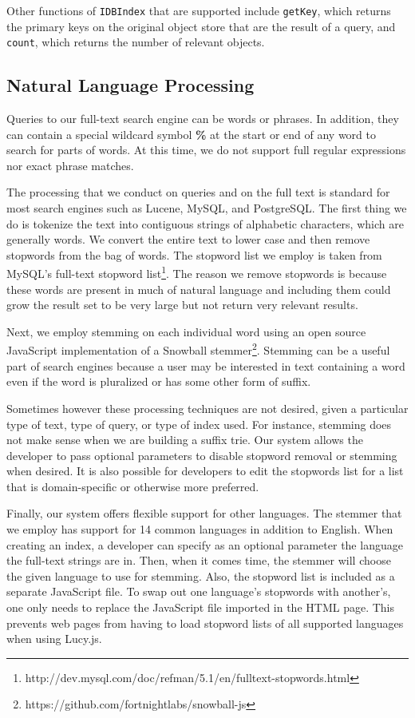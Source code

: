 \documentclass{vldb}
\begin{document}
Other functions of \texttt{IDBIndex} that are supported include \texttt{getKey}, which returns the primary keys on the original object store that are the result of a query, and \texttt{count}, which returns the number of relevant objects.


\subsection{Natural Language Processing}

Queries to our full-text search engine can be words or phrases. In addition, they can contain a special wildcard symbol \textbf{\%} at the start or end of any word to search for parts of words. At this time, we do not support full regular expressions nor exact phrase matches.

The processing that we conduct on queries and on the full text is standard for most search engines such as Lucene, MySQL, and PostgreSQL. The first thing we do is tokenize the text into contiguous strings of alphabetic characters, which are generally words. We convert the entire text to lower case and then remove stopwords from the bag of words. The stopword list we employ is taken from MySQL's full-text stopword list\footnote{http://dev.mysql.com/doc/refman/5.1/en/fulltext-stopwords.html}. The reason we remove stopwords is because these words are present in much of natural language and including them could grow the result set to be very large but not return very relevant results.

Next, we employ stemming on each individual word using an open source JavaScript implementation of a Snowball stemmer\footnote{https://github.com/fortnightlabs/snowball-js}. 
Stemming can be a useful part of search engines because a user may be interested in text containing a word even if the word is pluralized or has some other form of suffix.

Sometimes however these processing techniques are not desired, given a particular type of text, type of query, or type of index used. For instance, stemming does not make sense when we are building a suffix trie. Our system allows the developer to pass optional parameters to disable stopword removal or stemming when desired. It is also possible for developers to edit the stopwords list for a list that is domain-specific or otherwise more preferred.

Finally, our system offers flexible support for other languages. The stemmer that we employ has support for 14 common languages in addition to English. When creating an index, a developer can specify as an optional parameter the language the full-text strings are in. Then, when it comes time, the stemmer will choose the given language to use for stemming.
Also, the stopword list is included as a separate JavaScript file. To swap out one language's stopwords with another's, one only needs to replace the JavaScript file imported in the HTML page. This prevents web pages from having to load stopword lists of all supported languages when using Lucy.js. 
\end{document}
